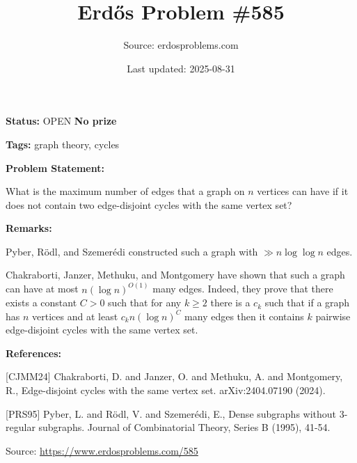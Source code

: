 \documentclass{article}
\title{Erd\H{o}s Problem \#585}
\date{Last updated: 2025-08-31}
\author{Source: erdosproblems.com}
\begin{document}
\maketitle

\noindent\textbf{Status:} OPEN \quad \textbf{No prize}

\noindent\textbf{Tags:} graph theory, cycles

\medskip
\noindent\textbf{Problem Statement:}

What is the maximum number of edges that a graph on $n$ vertices can have if it does not contain two edge-disjoint cycles with the same vertex set?

\bigskip
\noindent\textbf{Remarks:}

Pyber, R\"{o}dl, and Szemer\'{e}di \cite{PRS95} constructed such a graph with $\gg n\log\log n$ edges.

Chakraborti, Janzer, Methuku, and Montgomery \cite{CJMM24} have shown that such a graph can have at most $n(\log n)^{O(1)}$ many edges. Indeed, they prove that there exists a constant $C>0$ such that for any $k\geq 2$ there is a $c_k$ such that if a graph has $n$ vertices and at least $c_kn(\log n)^{C}$ many edges then it contains $k$ pairwise edge-disjoint cycles with the same vertex set.

\bigskip
\noindent\textbf{References:}

[CJMM24] Chakraborti, D. and Janzer, O. and Methuku, A. and Montgomery, R., Edge-disjoint cycles with the same vertex set. arXiv:2404.07190 (2024).
 
 [PRS95] Pyber, L. and R\"{o}dl, V. and Szemer\'{e}di, E., Dense subgraphs without 3-regular subgraphs. Journal of Combinatorial Theory, Series B (1995), 41-54.

\bigskip
\noindent\small{Source: \url{https://www.erdosproblems.com/585}}
\end{document}
